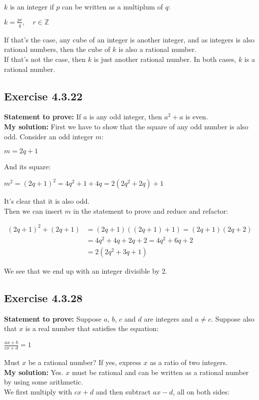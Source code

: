 \documentclass{article}
\newcommand{\cent}[1]{\begin{center}#1\end{center}}
\newcommand{\mAlign}[1]{\begin{align*}#1\end{align*}}
\newcommand{\doubleZ}{\mathbb{Z}}
\newcommand{\In}{\! \in \!}
\newcommand{\Prove}{\textbf{Statement to prove: }}
\newcommand{\Solution}{\textbf{My solution: }}
\newcommand{\QED}{\boxed{}}
\newcommand{\Exercise}[1]{\subsection{Exercise #1}}
\begin{document}
	$k$ is an integer if $p$ can be written as a multiplum of $q$:
	
	\cent{$k = \frac{pr}{q}, \quad r \In \doubleZ$}
	
	If that's the case, any cube of an integer is another integer, and as integers is also rational numbers, then the cube of $k$ is also a rational number.\\
	
	If that's not the case, then $k$ is just another rational number. In both cases, $k$ is a rational number.\\
	\QED
	
	\Exercise{4.3.22}
	
	\Prove
	If $a$ is any odd integer, then $a^2 + a$ is even.\\
	
	\Solution
	First we have to show that the square of any odd number is also odd. Consider an odd integer $m$:
	
	\cent{$m = 2q + 1$}
	
	And its square:
	
	\cent{$m^2 = (2q+1)^2 = 4q^2+1+4q = 2(2q^2 + 2q) + 1$}
	
	It's clear that it is also odd.\\
	
	Then we can insert $m$ in the statement to prove and reduce and refactor:
	
	\mAlign{(2q+1)^2 + (2q+1) &= (2q+1)((2q+1) + 1) = (2q+1)(2q+2) \\
					&= 4q^2 +4q + 2q +2 = 4q^2 +6q + 2 \\
					&= 2(2q^2+3q + 1)}
				
	We see that we end up with an integer divisible by 2.\\
	\QED
	
	\Exercise{4.3.28}
	
	\Prove
	Suppose $a$, $b$, $c$ and $d$ are integers and $a \neq c$. Suppose also that $x$ is a real number that satisfies the equation:
	
	\cent{$\frac{ax+b}{cx+d} = 1$}
	
	Must $x$ be a rational number? If yes, express $x$ as a ratio of two integers.\\
	
	\Solution
	Yes. $x$ must be rational and can be written as a rational number by using some arithmetic.\\
	
	We first multiply with $cx+d$ and then subtract $ax - d$, all on both sides:
	 
\end{document}

